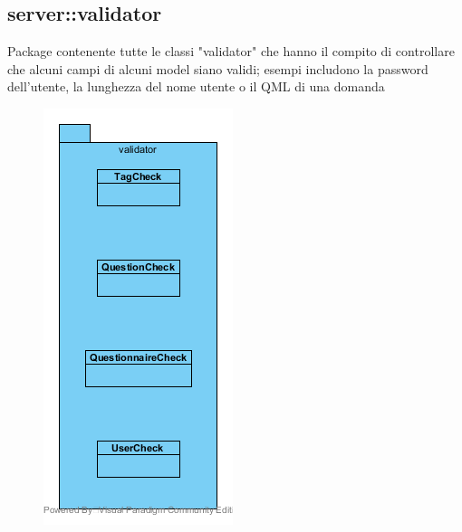 \subsection{server::validator}
Package contenente tutte le classi "validator" che hanno il compito di controllare che alcuni campi di alcuni model siano validi; esempi includono la password dell'utente, la lunghezza del nome utente o il QML di una domanda\begin{center}
	\begin{figure}[H]
		\centering \includegraphics[scale=4, max width=\textwidth, max height=\myheight]{../img/diagrammiClassi/server/validator.png}

\end{figure}
\end{center}
